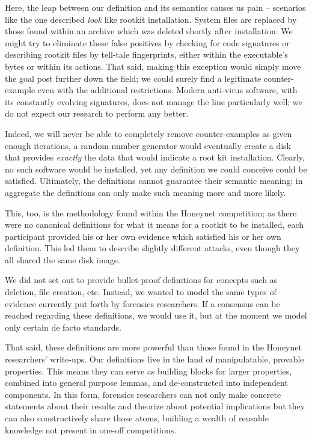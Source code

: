 \documentclass[nocopyrightspace]{sigplanconf}
\begin{document}
Here, the leap between our definition and its semantics causes us pain --
scenarios like the one described {\em look} like rootkit installation. System
files are replaced by those found within an archive which was deleted shortly
after installation. We might try to eliminate these false positives by
checking for code signatures or describing rootkit files by tell-tale
fingerprints, either within the executable's bytes or within its actions. That
said, making this exception would simply move the goal post further down the
field; we could surely find a legitimate counter-example even with the
additional restrictions. Modern anti-virus software, with its constantly
evolving signatures, does not manage the line particularly well; we do not
expect our research to perform any better.

Indeed, we will never be able to completely remove counter-examples as given
enough iterations, a random number generator would eventually create a disk
that provides {\em exactly} the data that would indicate a root kit
installation. Clearly, no such software would be installed, yet any definition
we could conceive could be satisfied. Ultimately, the definitions cannot
guarantee their semantic meaning; in aggregate the definitions can only make
such meaning more and more likely.

This, too, is the methodology found within the Honeynet competition; as there
were no canonical definitions for what it means for a rootkit to be installed,
each participant provided his or her own evidence which satisfied his or her
own definition. This led them to describe slightly different attacks, even
though they all shared the same disk image.

We did not set out to provide bullet-proof definitions for concepts such as
deletion, file creation, etc. Instead, we wanted to model the same types of
evidence currently put forth by forensics researchers. If a consensus can be
reached regarding these definitions, we would use it, but at the moment we
model only certain de facto standards.

That said, these definitions are more powerful than those found in the
Honeynet researchers' write-ups. Our definitions live in the land of
manipulatable, provable properties. This means they can serve as building
blocks for larger properties, combined into general purpose lemmas, and
de-constructed into independent components. In this form, forensics
researchers can not only make concrete statements about their results and
theorize about potential implications but they can also constructively share
those atoms, building a wealth of reusable knowledge not present in one-off
competitions.
\end{document}
